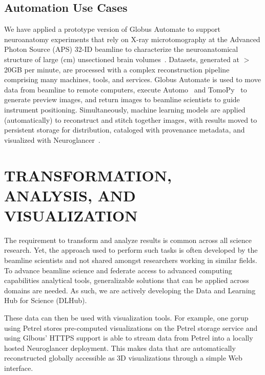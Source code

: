 \documentclass{aip-cp}
\newcommand\ryan[1]{}
\newcommand\kyle[1]{}
\newcommand\ryan[1]{{\color{green}[Ryan: #1]}}
\newcommand\kyle[1]{{\color{purple}[Kyle: #1]}}
\begin{document}
\subsection{Automation Use Cases}
\kyle{The following text is stolen from CSSI - do we want such an example?
If so, perhaps Ryan can make this accurate.. and add a nice picture.}

We have applied a prototype version of Globus Automate
to support neuroanatomy experiments that rely on
X-ray microtomography at the Advanced Photon Source (APS) 32-ID beamline to
characterize the neuroanatomical structure of large (cm) unsectioned brain 
volumes~\cite{kasthuri2015saturated}. 
Datasets, generated at $>$20GB per minute, are processed
with a complex reconstruction pipeline 
comprising many machines, tools, and services.  
Globus Automate is used to move data from beamline to remote computers,
execute Automo~\cite{Automo} and TomoPy~\cite{gursoy2014tomopy} 
to generate preview images, and return images to 
beamline scientists to guide instrument positioning. 
Simultaneously, machine learning models
are applied (automatically) to reconstruct and stitch together images, with results 
moved to persistent storage for distribution, cataloged with
provenance metadata, and visualized with Neuroglancer~\cite{Neuroglancer}. 

\kyle{Ryan another APS/ALS flow?}



\section{TRANSFORMATION, ANALYSIS, AND VISUALIZATION}
\ryan{Broader with DLhub as the focus.}

The requirement to transform and analyze results is common across all science research. Yet, the 
approach used to perform such tasks is often developed by the beamline scientists and not shared 
amongst researchers working in similar fields. To advance beamline science and federate access to 
advanced computing capabilities analytical tools, generalizable solutions that can be applied 
across domains are needed. As such, we are actively developing the Data and Learning Hub for 
Science (DLHub). 

These data can then be used with visualization tools. For example, one gorup using Petrel stores 
pre-computed visualizations on the Petrel storage service and using Glbous' HTTPS support is able 
to stream data from Petrel into a locally hosted Neuroglancer deployment. This makes data that are 
automatically reconstructed globally accessible as 3D 
visualizations through a simple Web interface.
\end{document}
